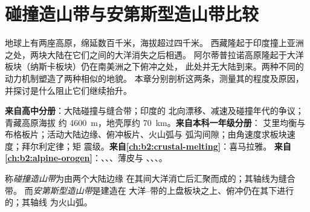 \chapter{碰撞造山带与安第斯型造山带比较}\label{ch:b2:himalaya-andes}

地球上有两座高原，绵延数百千米，海拔超过四千米。
西藏隆起于印度撞上亚洲之处，两块大陆在它们之间的大洋消失之后相遇。
阿尔蒂普拉诺高原隆起于大洋板块（纳斯卡板块）仍在南美洲之下俯冲之处，
此处并无大陆到来。两种不同的动力机制塑造了两种相似的地貌。
本章分别剖析这两条，测量其的程度及原因，
并探讨是什么阻止它们继续抬升。

\begin{recall}
\textbf{来自高中分册}：大陆碰撞与缝合带；印度的
北向漂移、减速及碰撞年代的争议；青藏高原海拔
约 \qty{4600}{m}，地壳厚约 \qty{70}{km}。\textbf{来自本科一年级分册}：
艾里均衡与布格板片；活动大陆边缘、俯冲板片、火山弧与
弧沟间隙；由角速度求板块速度；拜尔利定律；矩
震级。\textbf{来自\cref{ch:b2:crustal-melting}}：喜马拉雅。
\textbf{来自\cref{ch:b2:alpine-orogen}}：、、、薄皮与
、、、。
\end{recall}

\begin{definition}\label{def:b2:himalaya-andes:types}
称\emph{碰撞造山带}为由两个大陆边缘
在其间大洋消亡后汇聚而成的；其轴线为缝合带。
而\emph{安第斯型造山带}是建造在
大洋–带的上盘板块之上、俯冲仍在其下进行的；其轴线
为火山弧。
\end{definition}


